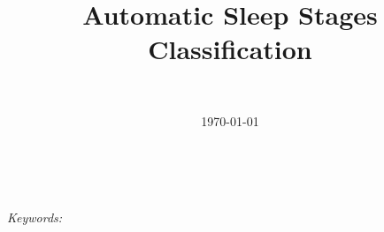 \documentclass[a4paper, 11pt]{article} %
\title{\textbf{Automatic Sleep Stages Classification}\\ %
} %
\author{\textsc{} %
\\{\textit{}}} %
\date{\today} %
\makeatletter
\renewcommand{\maketitle}{ %
\begin{flushright} %
{\LARGE\@title} %

\vspace{50pt} %

{\large\@author} %
\\\@date %

\vspace{40pt} %
\end{flushright}
}
\makeatother
\begin{document}
\maketitle %



\begin{abstract}

\end{abstract}

\hspace*{3,6mm}\textit{Keywords:}   %

\vspace{30pt} %

\end{document}
